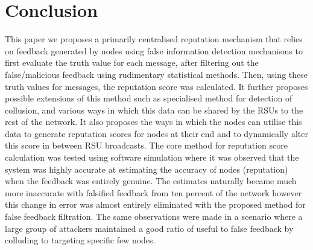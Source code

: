 \documentclass[journal]{IEEEtran}
\begin{document}
\section{Conclusion}
\label{sec:Conclusion}
This paper we proposes a primarily centralised reputation mechanism that relies on feedback generated by nodes using false information detection mechanisms to first evaluate the truth value for each message, after filtering out the false/malicious feedback using rudimentary statistical methods. Then, using these truth values for messages, the reputation score was calculated. It further proposes possible extensions of this method such as specialised method for detection of collusion, and various ways in which this data can be shared by the RSUs to the rest of the network. It also proposes the ways in which the nodes can utilise this data to generate reputation scores for nodes at their end and to dynamically alter this score in between RSU broadcasts. The core method for reputation score calculation was tested using software simulation where it was observed that the system was highly accurate at estimating the accuracy of nodes (reputation) when the feedback was entirely genuine. The estimates naturally became much more inaccurate with falsified feedback from ten percent of the network however this change in error was almost entirely eliminated with the proposed method for false feedback filtration. The same observations were made in a scenario where a large group of attackers maintained a good ratio of useful to false feedback by colluding to targeting specific few nodes.


%
\end{document}
